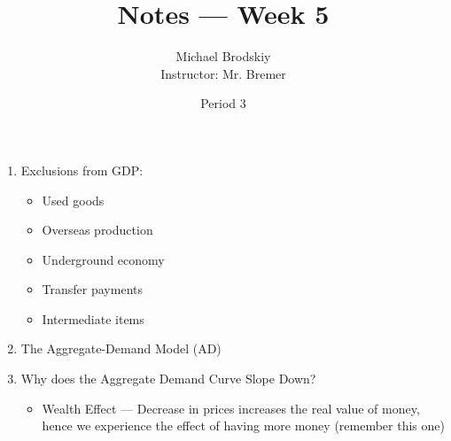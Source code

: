 \documentclass[12pt]{article}
\title{Notes — Week 5}
\date{Period 3}
\author{Michael Brodskiy\\ \small Instructor: Mr. Bremer}
\begin{document}
\maketitle

\begin{enumerate}

    \item Exclusions from GDP:

      \begin{itemize}

          \item Used goods

          \item Overseas production

          \item Underground economy

          \item Transfer payments

          \item Intermediate items

        \end{itemize}

      \item The Aggregate-Demand Model (AD)

    \begin{center}
    \end{center}

  \item Why does the Aggregate Demand Curve Slope Down?

    \begin{itemize}

      \item Wealth Effect — Decrease in prices increases the real value of money, hence we experience the effect of having more money (remember this one)

    \end{itemize}


\end{enumerate}
\end{document}
